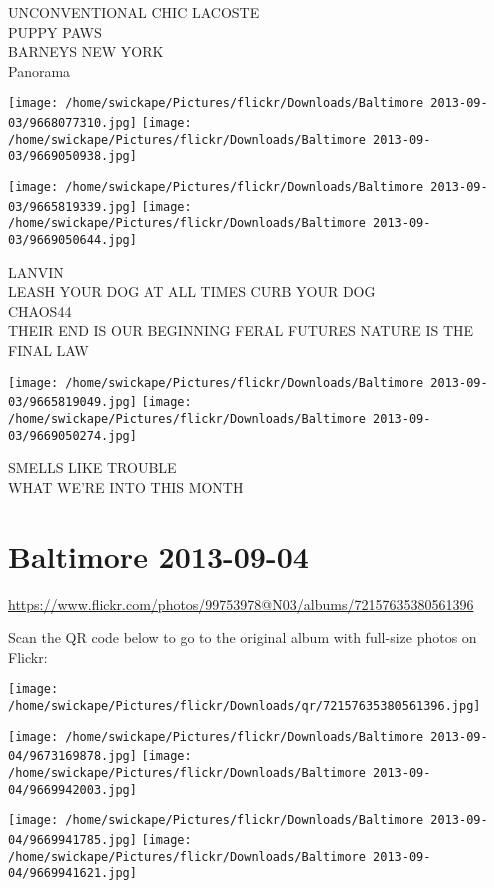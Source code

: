 \documentclass[10pt,letterpaper]{article}
\begin{document}
UNCONVENTIONAL CHIC LACOSTE\\
PUPPY PAWS\\
BARNEYS NEW YORK\\
Panorama
\pagebreak

\texttt{[image: /home/swickape/Pictures/flickr/Downloads/Baltimore 2013-09-03/9668077310.jpg]}
\texttt{[image: /home/swickape/Pictures/flickr/Downloads/Baltimore 2013-09-03/9669050938.jpg]}

\texttt{[image: /home/swickape/Pictures/flickr/Downloads/Baltimore 2013-09-03/9665819339.jpg]}
\texttt{[image: /home/swickape/Pictures/flickr/Downloads/Baltimore 2013-09-03/9669050644.jpg]}

LANVIN\\
LEASH YOUR DOG AT ALL TIMES CURB YOUR DOG\\
CHAOS44\\
THEIR END IS OUR BEGINNING FERAL FUTURES NATURE IS THE FINAL LAW
\pagebreak

\texttt{[image: /home/swickape/Pictures/flickr/Downloads/Baltimore 2013-09-03/9665819049.jpg]}
\texttt{[image: /home/swickape/Pictures/flickr/Downloads/Baltimore 2013-09-03/9669050274.jpg]}

SMELLS LIKE TROUBLE\\
WHAT WE'RE INTO THIS MONTH
\pagebreak

\section*{Baltimore 2013-09-04}

\url{https://www.flickr.com/photos/99753978@N03/albums/72157635380561396}

Scan the QR code below to go to the original album with full-size photos on Flickr:

\texttt{[image: /home/swickape/Pictures/flickr/Downloads/qr/72157635380561396.jpg]}
\pagebreak

\texttt{[image: /home/swickape/Pictures/flickr/Downloads/Baltimore 2013-09-04/9673169878.jpg]}
\texttt{[image: /home/swickape/Pictures/flickr/Downloads/Baltimore 2013-09-04/9669942003.jpg]}

\texttt{[image: /home/swickape/Pictures/flickr/Downloads/Baltimore 2013-09-04/9669941785.jpg]}
\texttt{[image: /home/swickape/Pictures/flickr/Downloads/Baltimore 2013-09-04/9669941621.jpg]}
\end{document}
